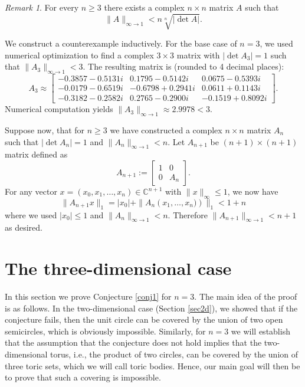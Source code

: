 \documentclass[12pt, a4paper]{article}
\theoremstyle{plain} %
\theoremstyle{definition} %
\theoremstyle{remark} %
\newtheorem{remark}[theorem]{Remark}
\begin{document}
\begin{remark}
For every $n \geq 3$ there exists a complex $n \times n$ matrix $A$ such that
$$ \|A\|_{\infty \to 1} < n \sqrt[n]{|\det{A}|}.$$

We construct a counterexample inductively. For the base case of $n=3$, we used numerical optimization to find a complex $3 \times 3$ matrix with $|\det A_3| = 1$ such that $\|A_3\|_{\infty \to 1} < 3$. The resulting matrix is (rounded to 4 decimal places):
$$
A_3 \approx 
\begin{bmatrix} 
-0.3857 - 0.5131i &  0.1795 - 0.5142i &  0.0675 - 0.5393i \\
-0.0179 - 0.6519i & -0.6798 + 0.2941i &  0.0611 + 0.1143i \\
-0.3182 - 0.2582i &  0.2765 - 0.2900i & -0.1519 + 0.8092i 
\end{bmatrix}.
$$
Numerical computation yields $\|A_3\|_{\infty \to 1} \approx 2.9978 < 3$.

Suppose now, that for $n \geq 3$ we have constructed a complex $n \times n$ matrix $A_n$ such that $| \det A_n | = 1$ and $\|A_n\|_{\infty \to 1} < n$. Let $A_{n+1}$ be $(n+1) \times (n+1)$ matrix defined as
$$A_{n+1}:=\left[ 
\begin{array}{c|c} 
  1 & 0 \\ 
  \hline 
  0 & A_n 
\end{array} \right].$$
For any vector $x = \left( x_0, x_1, \ldots, x_n\right) \in \mathbb{C}^{n+1}$ with $\|x\|_\infty \leq 1$, we now have 
\[
\|A_{n+1}x\|_1 = |x_0| +\|A_n \left(x_1, \ldots, x_n) \right)\|_1 < 1 + n
\]
where we used $|x_0| \leq 1$ and $\|A_n\|_{\infty \to 1} < n$. Therefore $\|A_{n+1}\|_{\infty \to 1} < n+1$ as desired.
\end{remark}


\section{The three-dimensional case}
\label{sec3d}

In this section we prove Conjecture \ref{conj1} for $n=3$. The main idea of the proof is as follows. In the two-dimensional case (Section \ref{sec2d}), we showed that if the conjecture fails, then the unit circle can be covered by the union of two open semicircles, which is obviously impossible. Similarly, for $n=3$ we will establish that the assumption that the conjecture does not hold implies that the two-dimensional torus, i.e., the product of two circles, can be covered by the union of three toric sets, which we will call toric bodies. Hence, our main goal will then be to prove that such a covering is impossible.
\end{document}
